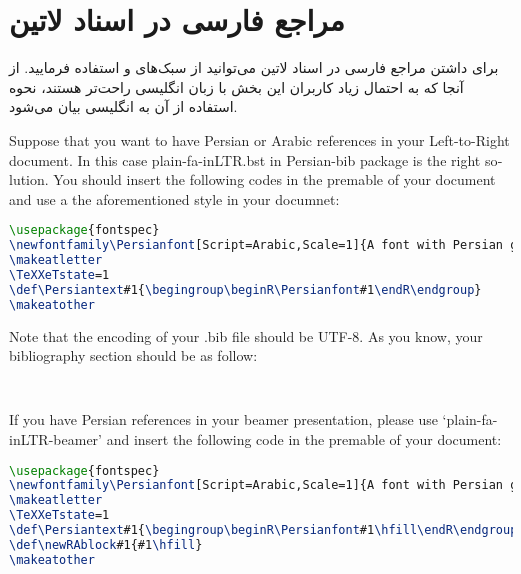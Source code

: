 \documentclass[a4paper]{article}
\theoremstyle{plain}\newtheorem{question}{پرسش}
\begin{document}
\section{مراجع فارسی در اسناد لاتین}
برای داشتن مراجع فارسی در اسناد لاتین می‌توانید از سبک‌های 
و
استفاده فرمایید. از آنجا که به احتمال زیاد کاربران این بخش با زبان انگلیسی راحت‌تر هستند، نحوه استفاده از آن به انگلیسی بیان می‌شود.
\begin{latin}
Suppose that you want to have Persian or Arabic references in your Left-to-Right document. In this case  plain-fa-inLTR.bst in Persian-bib package is the right solution.
You should insert the following codes in the premable of your document and use a the aforementioned style in your documnet:

\begin{lstlisting}[language=tex,breaklines=true, basicstyle=\ttfamily, numberstyle=\footnotesize, numbersep=10pt, captionpos=b, frame=single, breakatwhitespace=false]
\usepackage{fontspec}
\newfontfamily\Persianfont[Script=Arabic,Scale=1]{A font with Persian glifs such az XB Zar}
\makeatletter
\TeXXeTstate=1
\def\Persiantext#1{\begingroup\beginR\Persianfont#1\endR\endgroup}
\makeatother
\end{lstlisting}

Note that the encoding of your .bib file should be UTF-8. As you know, your bibliography section should be as follow:
\begin{verbatim}


\end{verbatim}

If you have Persian references in your beamer presentation, please use `plain-fa-inLTR-beamer' and insert the following code  in the premable of your document:

\begin{lstlisting}[language=tex,breaklines=true, basicstyle=\ttfamily, numberstyle=\footnotesize, numbersep=10pt, captionpos=b, frame=single, breakatwhitespace=false]
\usepackage{fontspec}
\newfontfamily\Persianfont[Script=Arabic,Scale=1]{A font with Persian glifs such az XB Zar}
\makeatletter
\TeXXeTstate=1
\def\Persiantext#1{\begingroup\beginR\Persianfont#1\hfill\endR\endgroup}
\def\newRAblock#1{#1\hfill}
\makeatother\end{lstlisting}
%

\end{latin}
\end{document}
